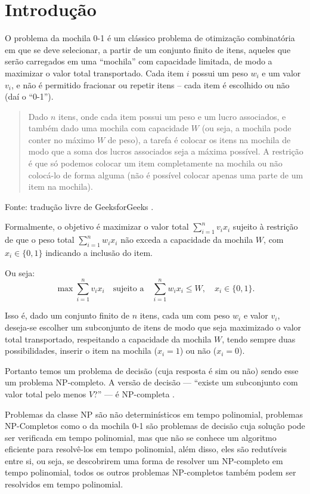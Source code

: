 \section{Introdução}

O problema da mochila 0-1 é um clássico problema de otimização combinatória em que se deve selecionar, a partir de um conjunto finito de itens,
aqueles que serão carregados em uma “mochila” com capacidade limitada, de modo a maximizar o valor total transportado.
Cada item $i$ possui um peso $w_i$ e um valor $v_i$, e não é permitido fracionar ou repetir itens – cada item é escolhido ou não (daí o “0-1”).

\begin{quote}
Dado \(n\) itens, onde cada item possui um peso e um lucro associados, e também dado uma mochila com capacidade \(W\) (ou seja, a mochila pode conter no máximo \(W\) de peso), a tarefa é colocar os itens na mochila de modo que a soma dos lucros associados seja a máxima possível. A restrição é que só podemos colocar um item completamente na mochila ou não colocá-lo de forma alguma (não é possível colocar apenas uma parte de um item na mochila).%
\end{quote}
Fonte: tradução livre de GeeksforGeeks \cite{geeksForGeeks-knapsack}.

Formalmente, o objetivo é maximizar o valor total $\sum_{i=1}^{n} v_i x_i$ sujeito à restrição de que o peso total $\sum_{i=1}^{n} w_i x_i$ não exceda
a capacidade da mochila $W$, com $x_i \in \{0,1\}$ indicando a inclusão do item.

Ou seja:
\[\max \sum_{i=1}^{n} v_i x_i   \quad\text{sujeito a}\quad   \sum_{i=1}^{n} w_i x_i \le W,   \quad x_i \in \{0,1\}.\]

Isso é, dado um conjunto finito de $n$ itens, cada um com peso $w_i$ e valor $v_i$, deseja-se escolher um subconjunto de itens de modo que seja maximizado o valor total transportado, respeitando a capacidade da mochila $W$, tendo sempre duas possibilidades, inserir o item na mochila ($x_i=1$) ou não ($x_i=0$).

Portanto temos um problema de decisão (cuja resposta é sim ou não) sendo esse um problema NP-completo. A versão de decisão — “existe um subconjunto com valor total pelo menos $V$?” — é NP-completa \cite{garey1979,karp1972}.


Problemas da classe NP são não determinísticos em tempo polinomial, problemas NP-Completos como o da mochila 0-1 são
problemas de decisão cuja solução pode ser verificada em tempo polinomial, mas que não se conhece um algoritmo eficiente para resolvê-los
em tempo polinomial, além disso, eles são redutíveis entre si, ou seja, se descobrirem uma forma de resolver um NP-completo em tempo polinomial, 
todos os outros problemas NP-completos também podem ser resolvidos em tempo polinomial.

